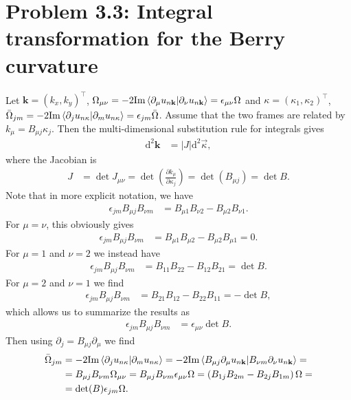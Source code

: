 \documentclass[english, parskip=full]{scrartcl}
\newcommand{\brak}{}
\newcommand{\kla}{}
\newcommand{\tecxt}{}
\begin{document}
\newpage
\section*{Problem 3.3: Integral transformation for the Berry curvature}
Let $\mathbf{k} = (k_x,k_y)^\top$, $\Omega_{\mu\nu} = -2\tecxt\text{Im\,} \brak\langle \partial_\mu u_{n\mathbf{k}} | \partial_\nu u_{n\mathbf{k}} \rangle = \epsilon_{\mu\nu}\Omega$ and $\kappa = (\kappa_1, \kappa_2)^\top$, $\bar{\Omega}_{jm}= -2\tecxt\text{Im\,} \brak\langle \partial_j u_{n\kappa} | \partial_m u_{n\kappa} \rangle = \epsilon_{jm} \bar{\Omega}$.
Assume that the two frames are related by $k_\mu = B_{\mu j}\kappa_j$.
Then the multi-dimensional substitution rule for integrals gives
\begin{align}
\tecxt\text{d}^2\mathbf{k} &= |J| \tecxt\text{d}^2\vec{\kappa},
\end{align}
where the Jacobian is
\begin{align}
J &= \det J_{\mu\nu} = \det \kla\left( \frac{\partial k_\mu }{\partial \kappa_j} \right) = \det \kla\left( B_{\mu j} \right) = \det B.
\end{align}
Note that in more explicit notation, we have
\begin{align}
\epsilon_{jm} B_{\mu j}B_{\nu m} &= B_{\mu 1}B_{\nu 2} - B_{\mu 2}B_{\nu 1}.
\end{align}
For $\mu=\nu$, this obviously gives
\begin{align}
\epsilon_{jm} B_{\mu j}B_{\nu m} &= B_{\mu 1}B_{\mu 2} - B_{\mu 2}B_{\mu 1} = 0.
\end{align}
For $\mu = 1$ and $\nu = 2$ we instead have
\begin{align}
\epsilon_{jm} B_{\mu j}B_{\nu m} &=  B_{1 1}B_{2 2} - B_{1 2}B_{2 1} = \det B.
\end{align}
For $\mu = 2$ and $\nu = 1$ we find 
\begin{align}
\epsilon_{jm} B_{\mu j}B_{\nu m} &=  B_{2 1}B_{1 2} - B_{2 2}B_{1 1} = -\det B,
\end{align}
which allows us to summarize the results as
\begin{align}
\epsilon_{jm} B_{\mu j}B_{\nu m} &=  \epsilon_{\mu\nu}\det B.
\end{align}
Then using $\partial_j = B_{\mu j}\partial_\mu$ we find
\begin{align}
\bar{\Omega}_{jm} &= -2\tecxt\text{Im\,}\brak\langle \partial_j u_{n\kappa} | \partial_m u_{n\kappa} \rangle = -2\tecxt\text{Im\,}\brak\langle B_{\mu j}\partial_\mu u_{n\mathbf{k}} | B_{\nu m}\partial_\nu u_{n\mathbf{k}} \rangle = \\
&= B_{\mu j}B_{\nu m} \Omega_{\mu\nu} = B_{\mu j}B_{\nu m} \epsilon_{\mu\nu} \Omega = \kla\left( B_{1j}B_{2m} - B_{2j}B_{1m} \right) \Omega = \\
&=  \det (B) \epsilon_{jm} \Omega.
\end{align}
\end{document}
